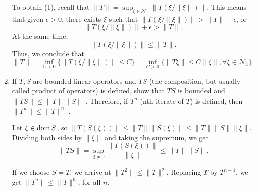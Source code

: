 \documentclass{article}
\theoremstyle{exercisestyle}
\newenvironment{exercise}[1]
  {\renewcommand\theinnerex{#1}\innerex}
  {\endinnerex}
\newcommand{\norm}[1]{\lVert #1 \rVert}
\begin{document}
\begin{exercise}{1.1.13}
\begin{enumerate}
              To obtain (1), recall that $\lVert T \rVert = \sup_{\xi \in \mathcal{N}_1} \lVert T \left( {\xi}/{\lVert \xi \rVert} \right) \rVert$. This means that given $\epsilon > 0$, there exists $\xi$
              such that $\lVert T \left( {\xi}/{\lVert \xi \rVert} \right) \rVert > \lVert T \rVert - \epsilon $, or $$\lVert T \left( {\xi}/{\lVert \xi \rVert} \right) \rVert + \epsilon > \lVert T \rVert.$$
              At the same time, $$\lVert T \left( {\xi}/{\lVert \xi \rVert} \right) \rVert \leq \lVert T \rVert.$$
              Thus, we conclude that
              $$\lVert T \rVert = \inf_{C>0} \{ \lVert T \left( {\xi}/{\lVert \xi \rVert} \right) \rVert \leq C\}
                  = \inf_{C>0} \{ \lVert T \xi \rVert \leq C {\lVert \xi \rVert} , \forall \xi \in \mathcal{N}_1 \}.$$

        \item If $T, S$ are bounded linear operators and $T S$ (the composition, but usually called
              product of operators) is defined, show that $T S$ is bounded and $\lVert T S \rVert \leq \lVert T \rVert \lVert S \rVert $ .
              Therefore, if $T^n$ (nth iterate of $T$) is defined, then $\lVert T ^n \rVert \leq \lVert T \rVert ^n$ .

              Let $\xi \in \operatorname{dom} S$, so $ \lVert T(S(\xi)) \rVert \leq  \lVert T \rVert  \lVert S(\xi) \rVert \leq \lVert T \rVert  \lVert S \rVert \lVert \xi \rVert $.
              Dividing both sides by $\lVert \xi \rVert $ and taking the supremum, we get
              $$ \lVert TS \rVert = \sup_{\xi \neq 0} \frac{\lVert T(S(\xi)) \rVert}{\lVert \xi \rVert } \leq \lVert T \rVert  \lVert S \rVert . $$

              If we choose $S = T$, we arrive at $\norm{T^2} \leq \norm{T}^2$. Replacing $T$ by $T^{n-1}$, we get $\norm{T^{n}} \leq  \norm{T} ^{n}$,
              for all $n$.

    \end{enumerate}

\end{exercise}
\end{document}

